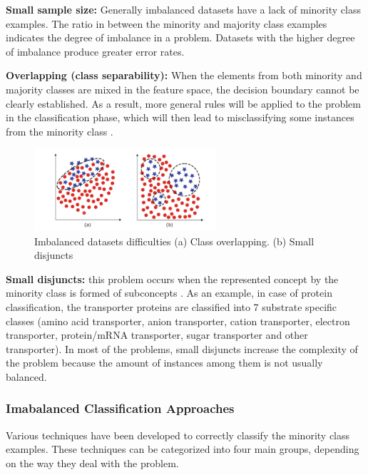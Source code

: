 \textbf{Small sample size:} Generally imbalanced datasets have a lack of minority class examples. 
The ratio in between the minority and majority class examples indicates the degree of imbalance 
in a problem. Datasets with the higher degree of imbalance produce greater error rates.

\textbf{Overlapping (class separability):} When the elements from both minority and majority classes 
are mixed in the feature space, the decision boundary cannot be clearly established. As a result, 
more general rules will be applied to the problem in the classification phase, which will then lead 
to misclassifying some instances from the minority class \cite{garcia_k-nn_2008}.

\begin{figure}[ht]
    \centering
    \includegraphics[width=0.60\textwidth]{figures/09overlapping.png}
    \caption{Imbalanced datasets difficulties (a) Class overlapping. (b) Small disjuncts \cite{fernandez_learning_2018}}
    \label{fig:overlapping}
\end{figure}

\textbf{Small disjuncts:} this problem occurs when the represented concept by the minority class is 
formed of subconcepts \cite{weiss_learning_2003}. As an example, in case of protein classification, the transporter 
proteins are classified into 7 substrate specific classes (amino acid transporter, anion 
transporter, cation transporter, electron transporter, protein/mRNA transporter, sugar transporter 
and other transporter). In most of the problems, small disjuncts increase the complexity of the 
problem because the amount of instances among them is not usually balanced.

\subsubsection{Imabalanced Classification Approaches}
Various techniques have been developed to correctly classify the minority class examples. 
These techniques can be categorized into four main groups, depending on the way they deal 
with the problem.

